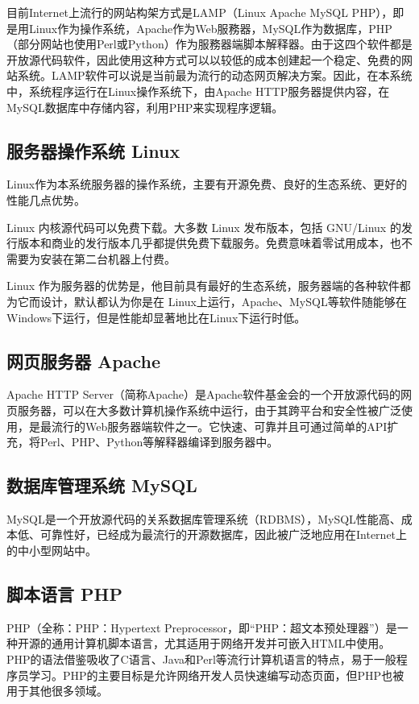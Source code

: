 目前Internet上流行的网站构架方式是LAMP（Linux Apache MySQL PHP），即是用Linux作为操作系统，Apache作为Web服務器，MySQL作为数据库，PHP（部分网站也使用Perl或Python）作为服務器端脚本解释器。由于这四个软件都是开放源代码软件，因此使用这种方式可以以较低的成本创建起一个稳定、免费的网站系统。LAMP软件可以说是当前最为流行的动态网页解决方案。因此，在本系统中，系统程序运行在Linux操作系统下，由Apache HTTP服务器提供内容，在MySQL数据库中存储内容，利用PHP来实现程序逻辑。

\subsection{服务器操作系统 Linux}

Linux作为本系统服务器的操作系统，主要有开源免费、良好的生态系统、更好的性能几点优势。

Linux 内核源代码可以免费下载。大多数 Linux 发布版本，包括 GNU/Linux 的发行版本和商业的发行版本几乎都提供免费下载服务。免费意味着零试用成本，也不需要为安装在第二台机器上付费。

Linux 作为服务器的优势是，他目前具有最好的生态系统，服务器端的各种软件都为它而设计，默认都认为你是在 Linux上运行，Apache、MySQL等软件随能够在Windows下运行，但是性能却显著地比在Linux下运行时低。

\subsection{网页服务器 Apache}
Apache HTTP Server（简称Apache）是Apache软件基金会的一个开放源代码的网页服务器，可以在大多数计算机操作系统中运行，由于其跨平台和安全性被广泛使用，是最流行的Web服务器端软件之一。它快速、可靠并且可通过简单的API扩充，将Perl、PHP、Python等解释器编译到服务器中。
\subsection{数据库管理系统 MySQL}
MySQL是一个开放源代码的关系数据库管理系统（RDBMS），MySQL性能高、成本低、可靠性好，已经成为最流行的开源数据库，因此被广泛地应用在Internet上的中小型网站中。
\subsection{脚本语言 PHP}
PHP（全称：PHP：Hypertext Preprocessor，即“PHP：超文本预处理器”）是一种开源的通用计算机脚本语言，尤其适用于网络开发并可嵌入HTML中使用。PHP的语法借鉴吸收了C语言、Java和Perl等流行计算机语言的特点，易于一般程序员学习。PHP的主要目标是允许网络开发人员快速编写动态页面，但PHP也被用于其他很多领域。
